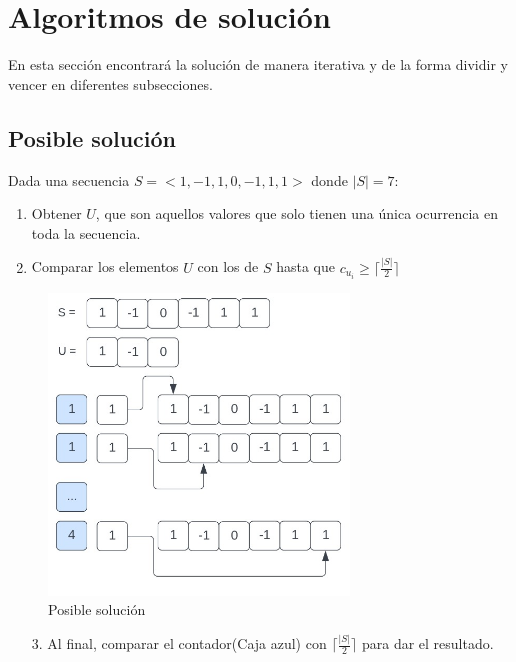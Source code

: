 \documentclass[]{article}
\begin{document}
\section{Algoritmos de solución}
En esta sección encontrará la solución de manera iterativa y de la forma dividir y vencer en diferentes subsecciones.
\subsection{Posible solución}
Dada una secuencia $S = < 1,-1,1,0,-1,1,1 >$ donde $|S|=7$:
\begin{enumerate}
    \item Obtener $U$, que son aquellos valores que solo tienen una única ocurrencia en toda la secuencia.
    \item Comparar los elementos $U$ con los de $S$ hasta que $c_{u_i} \geq \lceil\frac{|S|}{2}\rceil $
\end{enumerate}
\begin{figure}[h]
    \centering
    \includegraphics[width=8cm]{exp.jpeg}
    \caption{Posible solución}
\end{figure}
\begin{enumerate}
    \item[3.] Al final, comparar el contador(Caja azul) con $\lceil\frac{|S|}{2}\rceil$  para dar el resultado.
\end{enumerate}
\newpage
\end{document}
